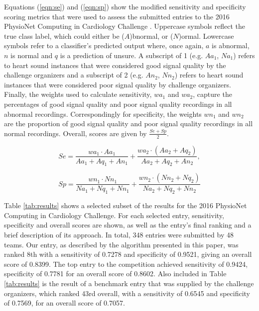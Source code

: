 \documentclass{article}
\begin{document}
Equations (\ref{eqn:se}) and (\ref{eqn:sp}) show the modified sensitivity and specificity scoring metrics that were used to assess the submitted entries to the 2016 PhysioNet Computing in Cardiology Challenge \cite{clifford2016classification}. Uppercase symbols reflect the true class label, which could either be ($A$)bnormal, or ($N$)ormal. Lowercase symbols refer to a classifier's predicted output where, once again, $a$ is abnormal, $n$ is normal and $q$ is a prediction of unsure. A subscript of 1 (e.g. $Aa_1$, $Na_1$) refers to heart sound instances that were considered good signal quality by the challenge organizers and a subscript of 2 (e.g. $An_2$, $Nn_2$) refers to heart sound instances that were considered poor signal quality by challenge organizers. Finally, the weights used to calculate sensitivity, $wa_1$ and $wa_2$, capture the percentages of good signal quality and poor signal quality recordings in all abnormal recordings. Correspondingly for specificity, the weights $wn_1$ and $wn_2$ are the proportion of good signal quality and poor signal quality recordings in all normal recordings. Overall, scores are given by $\frac{Se + Sp}{2}$.

\begin{equation}
Se = \frac{wa_1 \cdot Aa_1}{Aa_1 + Aq_1 + An_1} + \frac{wa_2 \cdot (Aa_2 +Aq_2)}{Aa_2 + Aq_2 + An_2},
\label{eqn:se}
\end{equation}

\begin{equation}
Sp = \frac{wn_1 \cdot Nn_1}{Na_1 +Nq_1 +Nn_1} + \frac{wn_2 \cdot (Nn_2 + Nq_2)}{Na_2 + Nq_2 + Nn_2}
\label{eqn:sp}
\end{equation}

Table \ref{tab:results} shows a selected subset of the results for the 2016 PhysioNet Computing in Cardiology Challenge. For each selected entry, sensitivity, specificity and overall scores are shown, as well as the entry's final ranking and a brief description of its approach. In total, 348 entries were submitted by 48 teams. Our entry, as described by the algorithm presented in this paper, was ranked 8th with a sensitivity of 0.7278 and specificity of 0.9521, giving an overall score of 0.8399. The top entry to the competition achieved sensitivity of 0.9424, specificity of 0.7781 for an overall score of 0.8602. Also included in Table \ref{tab:results} is the result of a benchmark entry that was supplied by the challenge organizers, which ranked 43rd overall, with a sensitivity of 0.6545 and specificity of 0.7569, for an overall score of 0.7057.
\end{document}
